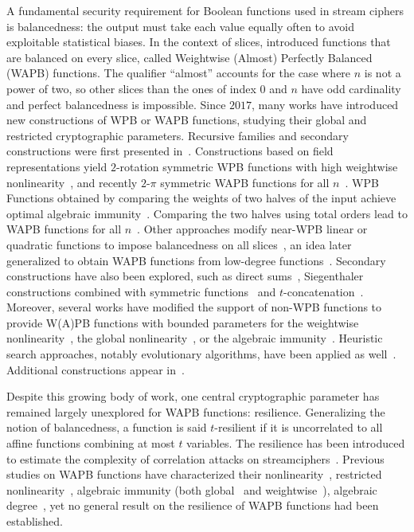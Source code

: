 \documentclass[11pt]{llncs}
\begin{document}
A fundamental security requirement for Boolean functions used in stream ciphers is balancedness: the output must take each value equally often to avoid exploitable statistical biases.
In the context of slices, \cite{TOSC:CarMeaRot17} introduced functions that are balanced on every slice, called Weightwise (Almost) Perfectly Balanced (WAPB) functions.
The qualifier “almost” accounts for the case where $n$ is not a power of two, so other slices than the ones of index $0$ and $n$ have odd cardinality and perfect balancedness is impossible.
Since $2017$, many works have introduced new constructions of WPB or WAPB functions, studying their global and restricted cryptographic parameters.
Recursive families and secondary constructions were first presented in~\cite{TOSC:CarMeaRot17}.
Constructions based on field representations yield $2$-rotation symmetric WPB functions with high weightwise nonlinearity~\cite{DCC:LiuMes19,CC:MSLZ22}, and recently $2$-$\pi$ symmetric WAPB functions for all $n$~\cite{eprint:DalMalMea24}.
WPB Functions obtained by comparing the weights of two halves of the input achieve optimal algebraic immunity~\cite{CC:TangLiu19,BFA:MesSuLi21}.
Comparing the two halves using total orders lead to WAPB functions for all $n$~\cite{SAC:Meaux24}.
Other approaches modify near-WPB linear or quadratic functions to impose balancedness on all slices~\cite{CC:MesSu21}, an idea later generalized to obtain WAPB functions from low-degree functions~\cite{DAM:LiSu20,DAM:GuoSu22,AMC:ZhangSu23,Mat:ZJZQ23,DAM:ZLCQZ23}.
Secondary constructions have also been explored, such as direct sums~\cite{DAM:ZhuSu22}, Siegenthaler constructions combined with symmetric functions~\cite{INDO:GinMea22} and $t$-concatenation~\cite{eprint:IsiRodSeh25}.
Moreover, several works have modified the support of non-WPB functions to %
provide W(A)PB functions with bounded parameters for
the weightwise nonlinearity~\cite{DAM:GinMea22}, the global nonlinearity~\cite{C2SI:GinMea23}, or the algebraic immunity~\cite{LC:GinMea23}.
Heuristic search approaches, notably evolutionary algorithms, have been applied as well~\cite{CEC:MPJDL22,ASIACCS:YCL+23,ACI:ManKuLar22}.
Additional constructions appear in~\cite{BFA:DalMal23,AMC:DalMal23,eprint:IsiRodSeh25}.


Despite this growing body of work, one central cryptographic parameter has remained largely unexplored for WAPB functions: resilience.
Generalizing the notion of balancedness, a function is said $t$-resilient if it is uncorrelated to all affine functions combining at most $t$ variables.
The resilience has been introduced to estimate the complexity of correlation attacks on streamciphers~\cite{Siegenthaler84}.
Previous studies on WAPB functions have characterized their nonlinearity~\cite{C2SI:GinMea23}, restricted nonlinearity~\cite{DAM:GinMea22}, algebraic immunity (both global~\cite{LC:GinMea23} and weightwise~\cite{CANS:BonMea25}), algebraic degree~\cite{CCDS:GinMea24}, yet no general result on the resilience of WAPB functions had been established.
\end{document}

